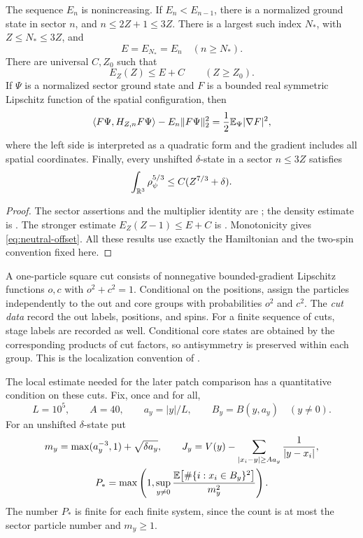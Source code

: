 \begin{lemma}\label{lem:sector-inputs}
The sequence $E_n$ is nonincreasing.  If $E_n<E_{n-1}$, there is a normalized
ground state in sector $n$, and $n\le2Z+1\le3Z$.  There is a largest such
index $N_*$, with $Z\le N_*\le3Z$, and
\[
 E=E_{N_*}=E_n\quad(n\ge N_*).
\]
There are universal $C,Z_0$ such that
\begin{equation}\label{eq:neutral-offset}
 E_Z(Z)\le E+C\qquad(Z\ge Z_0).
\end{equation}
If $\Psi$ is a normalized sector ground state and $F$ is a bounded real
symmetric Lipschitz function of the spatial configuration, then
\begin{equation}\label{eq:ground-multiplier}
 \langle F\Psi,H_{Z,n}F\Psi\rangle
       -E_n\|F\Psi\|_2^2
       =\frac12\mathbb E_\Psi|\nabla F|^2,
\end{equation}
where the left side is interpreted as a quadratic form and the gradient
includes all spatial coordinates.  Finally, every unshifted $\delta$-state
in a sector $n\le3Z$ satisfies
\begin{equation}\label{eq:global-density-input}
 \int_{\mathbb R^3}\rho_\psi^{5/3}\le C(Z^{7/3}+\delta).
\end{equation}
\end{lemma}

\begin{proof}
The sector assertions and the multiplier identity are
\cite[\FSectors]{Foundation}; the density estimate is
\cite[\FGlobalDensity]{Foundation}.  The stronger estimate
$E_Z(Z-1)\le E+C$ is \cite[\FNeutralOffset]{Foundation}.
Monotonicity gives \cref{eq:neutral-offset}.  All these results use exactly
the Hamiltonian and the two-spin convention fixed here.
\end{proof}

A one-particle square cut consists of nonnegative bounded-gradient Lipschitz
functions $o,c$ with $o^2+c^2=1$.  Conditional on the positions, assign the
particles independently to the out and core groups with probabilities $o^2$
and $c^2$.  The \emph{cut data} record the out labels, positions, and spins.
For a finite sequence of cuts, stage labels are recorded as well.  Conditional
core states are obtained by the corresponding products of cut factors, so
antisymmetry is preserved within each group.  This is the localization
convention of \cite[\FLocalization]{Foundation}.

The local estimate needed for the later patch comparison has a quantitative
condition on these cuts.  Fix, once and for all,
\[
 L=10^5,\qquad A=40,\qquad a_y=|y|/L,\qquad B_y=B(y,a_y)
       \quad(y\ne0).
\]
For an unshifted $\delta$-state put
\[
 \begin{gathered}
 m_y=\max(a_y^{-3},1)+\sqrt{\delta a_y},\qquad
 J_y=V(y)-\sum_{|x_i-y|\ge Aa_y}\frac1{|y-x_i|},\\
 P_* =\max\left(1,\sup_{y\ne0}
                 \frac{\mathbb E\bigl[\#\{i:x_i\in B_y\}^2\bigr]}{m_y^2}\right).
 \end{gathered}
\]
The number $P_*$ is finite for each finite system, since the count is at most
the sector particle number and $m_y\ge1$.

